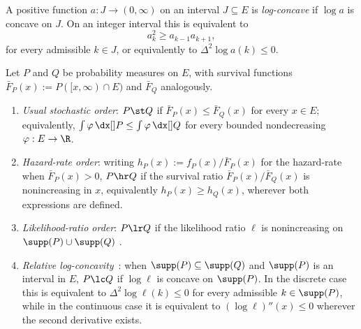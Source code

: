 \documentclass[11pt]{article}
\begin{document}
\begin{defn}
A positive function \(a:J\to(0,\infty)\) on an interval \(J\subseteq E\) is \emph{log-concave} if \(\log a\) is concave on \(J\). On an integer interval this is equivalent to
\[
a_k^2\ge a_{k-1}a_{k+1},
\]
for every admissible \(k\in J\), or equivalently to \(\Delta^2\log a(k)\le 0\).
\end{defn}

\begin{defn}\label{def:orders}
Let \(P\) and \(Q\) be probability measures on \(E\), with survival functions \(\bar F_P(x):=P([x,\infty)\cap E)\) and $\bar F_Q$ analogously.
\begin{enumerate}[label=\textup{(\roman*)}]

\item \emph{Usual stochastic order}: \(P\st Q\) if
\(\bar F_P(x)\le\bar F_Q(x)\) for every \(x\in E\); equivalently, \(\int\varphi\,\dx[]P\le\int\varphi\,\dx[]Q\) for every bounded nondecreasing \(\varphi:E\to\R\).

\item \emph{Hazard-rate order}: writing \(h_P(x):=f_P(x)/\bar F_P(x)\) for the hazard-rate when \(\bar F_P(x)>0\), \(P\hr Q\) if the survival ratio \(\bar F_P(x)/\bar F_Q(x)\) is nonincreasing in \(x\), equivalently \(h_P(x) \ge h_Q(x)\), wherever both expressions are defined.

\item \emph{Likelihood-ratio order}: \(P\lr Q\) if the likelihood ratio \(\ell\) is nonincreasing on \(\supp(P)\cup\supp(Q)\) \cite{KlenkeMattner2010, ShakedShanthikumar}.

\item \emph{Relative log-concavity}~\cite{Whitt1985,Yu2009}: when \(\supp(P)\subseteq\supp(Q)\) and \(\supp(P)\) is an interval in \(E\), \(P\lc Q\) if \(\log \ell\) is concave on \(\supp(P)\).  In the discrete case this is equivalent to \(\Delta^2\log\ell(k)\le 0\) for every admissible  \(k\in\supp(P)\), while in the continuous case it is equivalent to \((\log\ell)''(x)\le 0\) wherever the second derivative exists.
\end{enumerate}
\end{defn}

\end{document}
